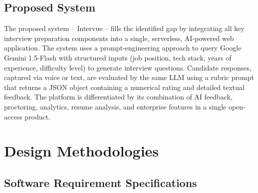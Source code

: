 \section{Proposed System}
The proposed system -- Intervue -- fills the identified gap by integrating all key interview
preparation components into a single, serverless, AI-powered web application. The system uses
a prompt-engineering approach to query Google Gemini 1.5-Flash with structured inputs (job
position, tech stack, years of experience, difficulty level) to generate interview questions.
Candidate responses, captured via voice or text, are evaluated by the same LLM using a rubric
prompt that returns a JSON object containing a numerical rating and detailed textual feedback.
The platform is differentiated by its combination of AI feedback, proctoring, analytics, resume
analysis, and enterprise features in a single open-access product.

\chapter{Design Methodologies}

\section{Software Requirement Specifications}

